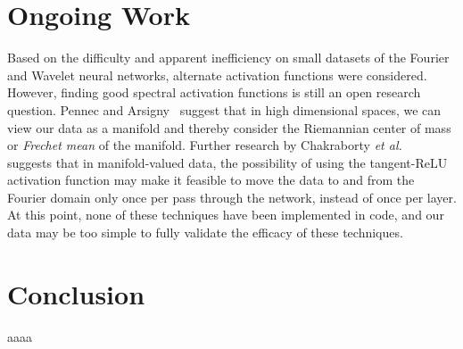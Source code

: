 \documentclass[10pt]{article}
\begin{document}
\section{Ongoing Work}
Based on the difficulty and apparent inefficiency on small datasets of the Fourier and Wavelet neural networks, alternate activation functions were considered. 
However, finding good spectral activation functions is still an open research question.
Pennec and Arsigny~\cite{pennec2013information} suggest that in high dimensional spaces, we can view our data as a manifold and thereby consider the Riemannian center of mass or \textit{Frechet mean} of the manifold.
Further research by Chakraborty \textit{et al.}~\cite{chakraborty2019surreal} suggests that in manifold-valued data, the possibility of using the tangent-ReLU activation function may make it feasible to move the data to and from the Fourier domain only once per pass through the network, instead of once per layer.
At this point, none of these techniques have been implemented in code, and our data may be too simple to fully validate the efficacy of these techniques.

\section{Conclusion}
aaaa



\end{document}
